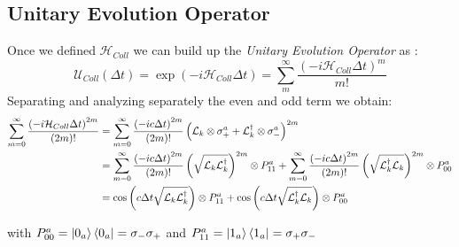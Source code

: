 \documentclass[a4paper,12pt]{article}
\begin{document}
\subsection{Unitary Evolution Operator}
Once we defined $ \mathcal{H}_{Coll} $ we can build up the \textit{Unitary Evolution Operator} as : 
\begin{equation}
	\mathcal{U}_{Coll} \left( \Delta t \right) = \exp \left( -i \mathcal{H}_{Coll} \Delta t \right) = \sum_{m}^{\infty}{\frac{\left( -i \mathcal{H}_{Coll} \Delta t \right)^{m}}{m!}}
\end{equation}
Separating and analyzing separately the even and odd term we obtain: 
\begin{align}
	\sum_{m=0}^{\infty}{ \frac{\left( -i \mathcal{H}_{Coll} \Delta t \right)^{2m}}{(2m)!} } &= \sum_{m=0}^{\infty}{ \frac{\left( -i c \Delta t \right)^{2m}}{(2m)!} \left( \mathcal{L}_{k} \otimes \sigma_{+}^{a} + \mathcal{L}_{k}^{\dagger} \otimes \sigma_{-}^{a} \right)^{2m}} \notag \\
	&= \sum_{m=0}^{\infty}{ \frac{\left( -i c \Delta t \right)^{2m}}{(2m)!} \left( \sqrt{\mathcal{L}_{k} \mathcal{L}_{k}^{\dagger} }\right)^{2m} \otimes P_{11}^{a} } + \sum_{m=0}^{\infty}{ \frac{\left( -i c \Delta t \right)^{2m}}{(2m)!} \left( \sqrt{\mathcal{L}_{k}^{\dagger} \mathcal{L}_{k} }\right)^{2m} \otimes P_{00}^{a} } \notag \\
	&= \cos{\left(c \Delta t \sqrt{\mathcal{L}_{k} \mathcal{L}_{k}^{\dagger} }\right) } \otimes P_{11}^{a} + \cos{\left(c \Delta t \sqrt{\mathcal{L}_{k}^{\dagger} \mathcal{L}_{k} } \right) } \otimes P_{00}^{a}
\end{align} 

with $P_{00}^{a} = \ket{0_{a}} \bra{0_{a}} = \sigma_{-}\sigma_{+}$ and $ P_{11}^{a} = \ket{1_{a}} \bra{1_{a}} = \sigma_{+}\sigma_{-}  $
\end{document}
